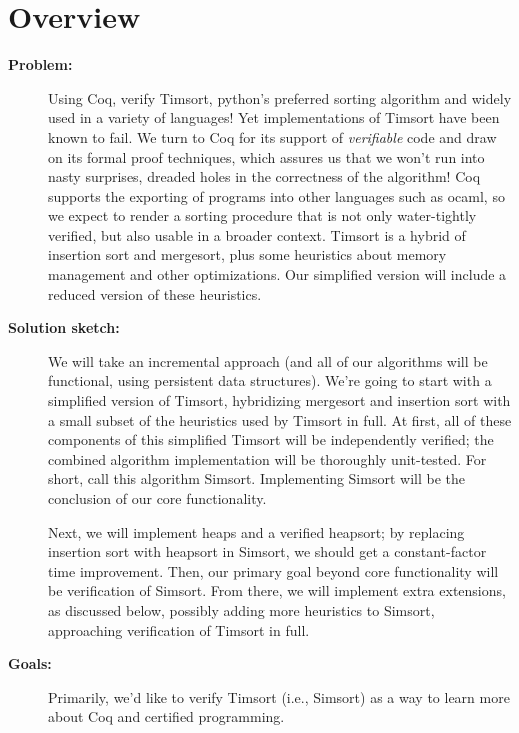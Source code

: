 \documentclass{article}
\begin{document}


\section{Overview}
\begin{description}
  \item[\textbf{Problem:}]
    Using Coq, verify Timsort, python's preferred sorting algorithm and widely used in a variety of languages! Yet implementations of Timsort have been known to fail. We turn to Coq for its support of \emph{verifiable} code and draw on its formal proof techniques, which assures us that we won't run into nasty surprises, dreaded holes in the correctness of the algorithm! Coq supports the exporting of programs into other languages such as ocaml, so we expect to render a sorting procedure that is not only water-tightly verified, but also usable in a broader context. Timsort is a hybrid of insertion sort and mergesort, plus some heuristics about memory management and other optimizations. Our simplified version will include a reduced version of these heuristics.

  \item[\textbf{Solution sketch:}]
    We will take an incremental approach (and all of our algorithms
    will be functional, using persistent data structures).
    We're going to start with a
    simplified version of Timsort,
    hybridizing mergesort and insertion sort
    with a small subset of the heuristics used by Timsort in full.
    At first, all of these components of this simplified Timsort will
    be independently verified; the combined algorithm implementation
    will be thoroughly unit-tested.
    For short, call this algorithm Simsort.
    Implementing Simsort will be the conclusion of our core functionality.

    Next, we will implement heaps and a verified heapsort;
    by replacing insertion sort with heapsort in Simsort,
    we should get a constant-factor time improvement.
    Then, our primary goal beyond core functionality will
    be verification of Simsort.
    From there, we will implement extra extensions, as discussed below,
    possibly adding more heuristics to Simsort, approaching verification
    of Timsort in full.

  \item[\textbf{Goals:}]
    Primarily, we'd like to verify Timsort (i.e., Simsort) as a way to
    learn more about Coq and certified programming.

\end{description}
\end{document}
